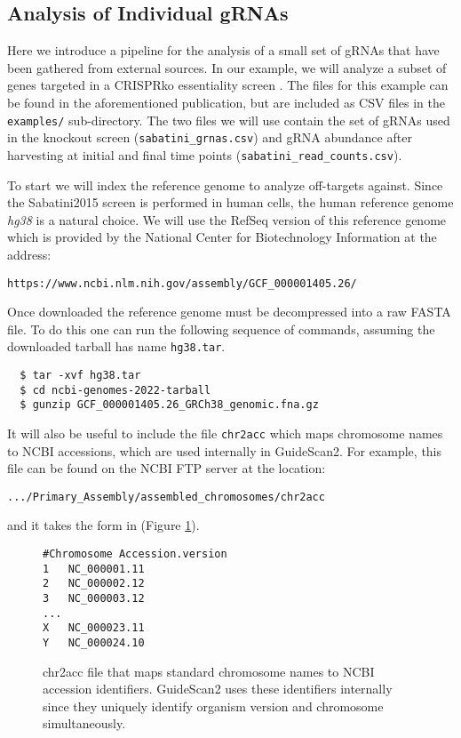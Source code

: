 \documentclass[10pt]{article}
\begin{document}
\subsection{Analysis of Individual gRNAs}
Here we introduce a pipeline for the analysis of a small set of gRNAs
that have been gathered from external sources. In our example, we will
analyze a subset of genes targeted in a CRISPRko essentiality screen
\parencite{Wang1096}.  The files for this example can be found in the
aforementioned publication, but are included as CSV files in the
\texttt{examples/} sub-directory. The two files we will use contain
the set of gRNAs used in the knockout screen
(\texttt{sabatini\_grnas.csv}) and gRNA abundance after harvesting at
initial and final time points (\texttt{sabatini\_read\_counts.csv}).

To start we will index the reference genome to analyze off-targets
against. Since the Sabatini2015 screen is performed in human cells,
the human reference genome \textit{hg38} is a natural choice. We will
use the RefSeq version of this reference genome which is provided by
the National Center for Biotechnology Information at the address:

\begin{center}
\texttt{https://www.ncbi.nlm.nih.gov/assembly/GCF\_000001405.26/}
\end{center}

Once downloaded the reference genome must be decompressed into a raw
FASTA file.  To do this one can run the following sequence of
commands, assuming the downloaded tarball has name \texttt{hg38.tar}.

\begin{verbatim}
  $ tar -xvf hg38.tar
  $ cd ncbi-genomes-2022-tarball
  $ gunzip GCF_000001405.26_GRCh38_genomic.fna.gz
\end{verbatim}

It will also be useful to include the file \texttt{chr2acc} which maps
chromosome names to NCBI accessions, which are used internally in
GuideScan2. For example, this file can be found on the NCBI FTP server
at the location:

\begin{center}
\texttt{.../Primary\_Assembly/assembled\_chromosomes/chr2acc}
\end{center}

and it takes the form in (Figure \ref{fig:chr2acc}).

\begin{figure}[t]
  \centering
  \begin{verbatim}
#Chromosome	Accession.version
1	NC_000001.11
2	NC_000002.12
3	NC_000003.12
...
X	NC_000023.11
Y	NC_000024.10
    \end{verbatim}
    \caption{\label{fig:chr2acc} chr2acc file that maps standard
      chromosome names to NCBI accession identifiers. GuideScan2 uses
      these identifiers internally since they uniquely identify
      organism version and chromosome simultaneously. }
\end{figure}
\end{document}
